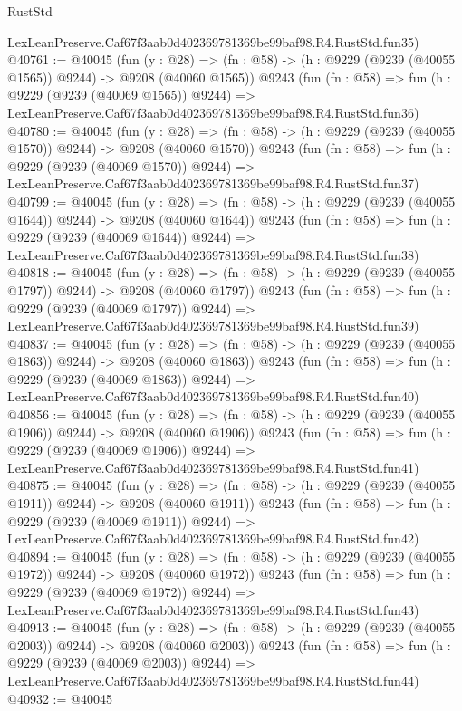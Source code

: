 \begin{lexlean}{RustStd}
\begin{coremodule}
    LexLeanPreserve.Caf67f3aab0d402369781369be99baf98.R4.RustStd.fun35)
@40761 := @40045
    (fun (y : @28) =>
    (fn : @58) -> (h : @9229 (@9239 (@40055 @1565)) @9244) -> @9208 (@40060 @1565))
    @9243
    (fun (fn : @58) =>
    fun (h : @9229 (@9239 (@40069 @1565)) @9244) =>
    LexLeanPreserve.Caf67f3aab0d402369781369be99baf98.R4.RustStd.fun36)
@40780 := @40045
    (fun (y : @28) =>
    (fn : @58) -> (h : @9229 (@9239 (@40055 @1570)) @9244) -> @9208 (@40060 @1570))
    @9243
    (fun (fn : @58) =>
    fun (h : @9229 (@9239 (@40069 @1570)) @9244) =>
    LexLeanPreserve.Caf67f3aab0d402369781369be99baf98.R4.RustStd.fun37)
@40799 := @40045
    (fun (y : @28) =>
    (fn : @58) -> (h : @9229 (@9239 (@40055 @1644)) @9244) -> @9208 (@40060 @1644))
    @9243
    (fun (fn : @58) =>
    fun (h : @9229 (@9239 (@40069 @1644)) @9244) =>
    LexLeanPreserve.Caf67f3aab0d402369781369be99baf98.R4.RustStd.fun38)
@40818 := @40045
    (fun (y : @28) =>
    (fn : @58) -> (h : @9229 (@9239 (@40055 @1797)) @9244) -> @9208 (@40060 @1797))
    @9243
    (fun (fn : @58) =>
    fun (h : @9229 (@9239 (@40069 @1797)) @9244) =>
    LexLeanPreserve.Caf67f3aab0d402369781369be99baf98.R4.RustStd.fun39)
@40837 := @40045
    (fun (y : @28) =>
    (fn : @58) -> (h : @9229 (@9239 (@40055 @1863)) @9244) -> @9208 (@40060 @1863))
    @9243
    (fun (fn : @58) =>
    fun (h : @9229 (@9239 (@40069 @1863)) @9244) =>
    LexLeanPreserve.Caf67f3aab0d402369781369be99baf98.R4.RustStd.fun40)
@40856 := @40045
    (fun (y : @28) =>
    (fn : @58) -> (h : @9229 (@9239 (@40055 @1906)) @9244) -> @9208 (@40060 @1906))
    @9243
    (fun (fn : @58) =>
    fun (h : @9229 (@9239 (@40069 @1906)) @9244) =>
    LexLeanPreserve.Caf67f3aab0d402369781369be99baf98.R4.RustStd.fun41)
@40875 := @40045
    (fun (y : @28) =>
    (fn : @58) -> (h : @9229 (@9239 (@40055 @1911)) @9244) -> @9208 (@40060 @1911))
    @9243
    (fun (fn : @58) =>
    fun (h : @9229 (@9239 (@40069 @1911)) @9244) =>
    LexLeanPreserve.Caf67f3aab0d402369781369be99baf98.R4.RustStd.fun42)
@40894 := @40045
    (fun (y : @28) =>
    (fn : @58) -> (h : @9229 (@9239 (@40055 @1972)) @9244) -> @9208 (@40060 @1972))
    @9243
    (fun (fn : @58) =>
    fun (h : @9229 (@9239 (@40069 @1972)) @9244) =>
    LexLeanPreserve.Caf67f3aab0d402369781369be99baf98.R4.RustStd.fun43)
@40913 := @40045
    (fun (y : @28) =>
    (fn : @58) -> (h : @9229 (@9239 (@40055 @2003)) @9244) -> @9208 (@40060 @2003))
    @9243
    (fun (fn : @58) =>
    fun (h : @9229 (@9239 (@40069 @2003)) @9244) =>
    LexLeanPreserve.Caf67f3aab0d402369781369be99baf98.R4.RustStd.fun44)
@40932 := @40045

\end{coremodule}
\end{lexlean}
